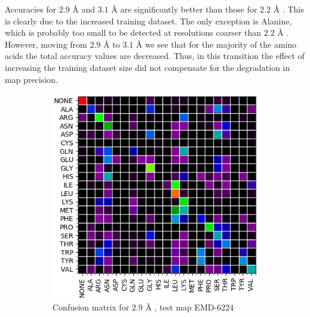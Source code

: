  Accuracies for $2.9$ {\AA}  and $3.1$ {\AA}  are significantly better than those for $2.2$ {\AA} . This is clearly due to the increased training dataset. 
 The only exception is Alanine, which is probably too small to be detected at resolutions coarser than $2.2$ {\AA} .
However, moving from $2.9$ {\AA}  to $3.1$ {\AA}  we see that for the majority of the amino acids the total accuracy values are decreased.
Thus, in this transition the effect of increasing the training dataset size did not compensate for the degradation in map precision.
 
 




\begin{figure}[!ht]
\begin{minipage}[b]{0.45\linewidth}
\begin{subfigure}[b]{\linewidth}
	\includegraphics[width=1.0\textwidth]{pics/CM_29_RR}
	\caption{Confusion matrix for $2.9$ {\AA} , test map  EMD-6224}
	\label{f:CM_29_RR}
\end{subfigure}
\end{minipage}
\begin{minipage}[b]{0.45\linewidth}
\begin{subfigure}[b]{\linewidth}

\end{subfigure}
\end{minipage}
\end{figure}
